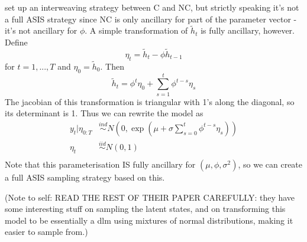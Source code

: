 \documentclass{article}
\begin{document}
\citeauthor{kastner2013ancillarity} set up an interweaving strategy between C and NC, but strictly speaking it's not a full ASIS strategy since NC is only ancillary for part of the parameter vector - it's not ancillary for $\phi$. A simple transformation of $\tilde{h}_t$ is fully ancillary, however. Define
\[
\eta_t = \tilde{h}_t - \phi\tilde{h}_{t-1}
\]
for $t=1,...,T$ and $\eta_0=\tilde{h}_0$. Then
\[
\tilde{h}_t = \phi^t \eta_0 + \sum_{s=1}^t \phi^{t-s}\eta_s
\]
The jacobian of this transformation is triangular with 1's along the diagonal, so its determinant is 1. Thus we can rewrite the model as
\begin{align}
y_t|\eta_{0:T} & \stackrel{ind}{\sim} N(0, \exp(\mu + \sigma\sum_{s=0}^t\phi^{t-s}\eta_s))\label{PNC1}\\
\eta_t & \stackrel{iid}{\sim} N(0,1)\label{PNC2}\\
\end{align}
Note that this parameterisation IS fully ancillary for $(\mu,\phi,\sigma^2)$, so we can create a full ASIS sampling strategy based on this.

(Note to self: READ THE REST OF THEIR PAPER CAREFULLY: they have some interesting stuff on sampling the latent states, and on transforming this model to be essentially a dlm using mixtures of normal distributions, making it easier to sample from.)


\end{document}
